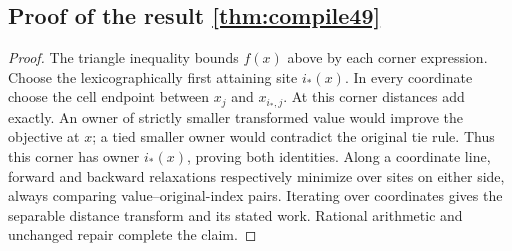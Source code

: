 \subsection{Proof of the result \ref{thm:compile49}}\label{supp:proof-core49-3}
\begin{proof}
The triangle inequality bounds $f(x)$ above by each corner expression. Choose the lexicographically first attaining site $i_*(x)$. In every coordinate choose the cell endpoint between $x_j$ and $x_{i_*,j}$. At this corner distances add exactly. An owner of strictly smaller transformed value would improve the objective at $x$; a tied smaller owner would contradict the original tie rule. Thus this corner has owner $i_*(x)$, proving both identities. Along a coordinate line, forward and backward relaxations respectively minimize over sites on either side, always comparing value--original-index pairs. Iterating over coordinates gives the separable distance transform and its stated work. Rational arithmetic and unchanged repair complete the claim.
\end{proof}

